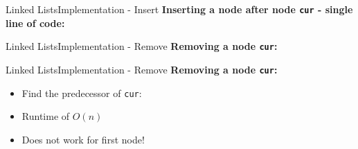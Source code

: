 \begin{frame}{Linked Lists}{Implementation - Insert}
  \textbf{Inserting a node after node \texttt{cur} - single line of code:}
  \begin{center}
    \begin{adjustbox}{width=0.8\linewidth}
      
    \end{adjustbox}
  \end{center}
  \begin{center}
    \begin{adjustbox}{width=0.8\linewidth}
      
    \end{adjustbox}
  \end{center}
\end{frame}


\begin{frame}{Linked Lists}{Implementation - Remove}
  \textbf{Removing a node \texttt{cur}:}
  \begin{flushleft}
    
  \end{flushleft}
\end{frame}


\begin{frame}{Linked Lists}{Implementation - Remove}
  \textbf{Removing a node \texttt{cur}:}
  \begin{itemize}
    \item<2->
      Find the predecessor of \texttt{cur}:\\
      
    \item<3->
      Runtime of $O(n)$
    \item<4->
      Does not work for first node!
  \end{itemize}
  \vspace{-1.5em}
  \begin{flushleft}
    
  \end{flushleft}
\end{frame}

